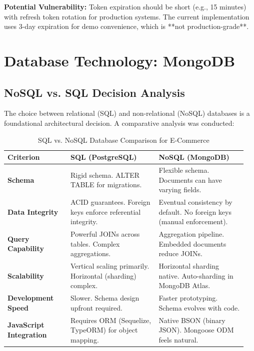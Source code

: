 \textbf{Potential Vulnerability:} Token expiration should be short (e.g., 15 minutes) with refresh token rotation for production systems. The current implementation uses 3-day expiration for demo convenience, which is **not production-grade**.

\section{Database Technology: MongoDB}

\subsection{NoSQL vs. SQL Decision Analysis}

The choice between relational (SQL) and non-relational (NoSQL) databases is a foundational architectural decision. A comparative analysis was conducted:

\begin{table}[H]
\centering
\caption{SQL vs. NoSQL Database Comparison for E-Commerce}
\label{tab:sql_vs_nosql}
\begin{tabular}{@{}p{0.25\linewidth}p{0.35\linewidth}p{0.35\linewidth}@{}}
\toprule
\textbf{Criterion} & \textbf{SQL (PostgreSQL)} & \textbf{NoSQL (MongoDB)} \\
\midrule
\textbf{Schema} & Rigid schema. ALTER TABLE for migrations. & Flexible schema. Documents can have varying fields. \\
\textbf{Data Integrity} & ACID guarantees. Foreign keys enforce referential integrity. & Eventual consistency by default. No foreign keys (manual enforcement). \\
\textbf{Query Capability} & Powerful JOINs across tables. Complex aggregations. & Aggregation pipeline. Embedded documents reduce JOINs. \\
\textbf{Scalability} & Vertical scaling primarily. Horizontal (sharding) complex. & Horizontal sharding native. Auto-sharding in MongoDB Atlas. \\
\textbf{Development Speed} & Slower. Schema design upfront required. & Faster prototyping. Schema evolves with code. \\
\textbf{JavaScript Integration} & Requires ORM (Sequelize, TypeORM) for object mapping. & Native BSON (binary JSON). Mongoose ODM feels natural. \\
\bottomrule
\end{tabular}
\end{table}

